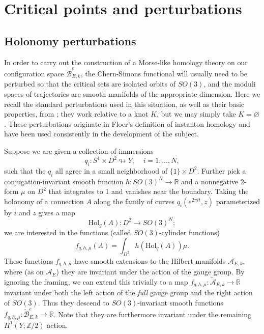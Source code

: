 \documentclass{memo-l}
\theoremstyle{definition}
\theoremstyle{remark}
\numberwithin{section}{chapter}
\numberwithin{equation}{chapter}
\begin{document}
\chapter{Critical points and perturbations}\label{chap:3}
\section{Holonomy perturbations}\label{sec:3d-pert}
In order to carry out the construction of a Morse-like homology theory on our configuration space $\widetilde{\mathcal B}^{e}_{E,k}$, the Chern-Simons functional will usually need to be perturbed so that the critical sets are isolated orbits of $SO(3)$, and the moduli spaces of trajectories are smooth manifolds of the appropriate dimension. Here we recall the standard perturbations used in this situation, as well as their basic properties, from \cite[Section~3.2]{KM1}; they work relative to a knot $K$, but we may simply take $K = \varnothing$. These perturbations originate in Floer's definition of instanton homology and have been used consistently in the development of the subject.

Suppose we are given a collection of immersions 
$$q_i: S^1 \times D^2 \looparrowright Y, \;\;\;\; i = 1, \dots, N,$$ 
such that the $q_i$ all agree in a small neighborhood of $\{1\} \times D^2$. Further pick a conjugation-invariant smooth function $h: SO(3)^N \to \mathbb R$ and a nonnegative 2-form $\mu$ on $D^2$ that integrates to 1 and vanishes near the boundary. Taking the holonomy of a connection $A$ along the family of curves $q_i(e^{2\pi i t},z)$ parameterized by $i$ and $z$ gives a map 
$$\text{Hol}_q(A): D^2 \to SO(3)^N;$$
we are interested in the functions (called $SO(3)$-cylinder functions) 
$$f_{q,h,\mu}(A) = \int_{D^2} h(\text{Hol}_q(A)) \mu.$$ 
These functions $f_{q,h,\mu}$ have smooth extensions to the Hilbert manifolds $\mathcal A_{E,k}$, where (as on $\mathcal A_E$) they are invariant under the action of the gauge group. By ignoring the framing, we can extend this trivially to a map $f_{q,h,\mu}: \widetilde{\mathcal A}_{E,k} \to \mathbb R$ invariant under both the left action of the \textit{full} gauge group and the right action of $SO(3)$. Thus they descend to $SO(3)$-invariant smooth functions $f_{q,h,\mu}: \widetilde{\mathcal B}^e_{E,k} \to \mathbb R$. Note that they are furthermore invariant under the remaining $H^1(Y;\mathbb Z/2)$ action. 
\end{document}
